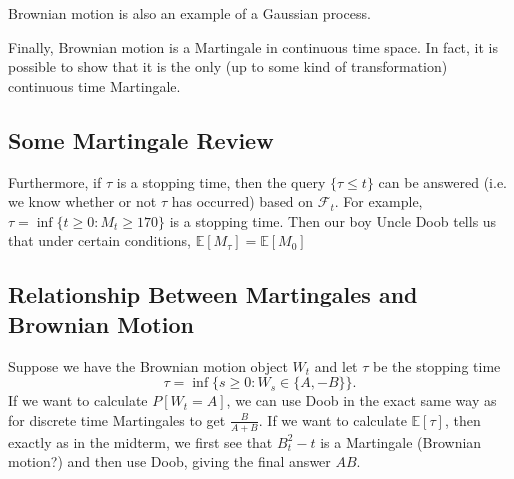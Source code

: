 Brownian motion is also an example of a Gaussian process.

Finally, Brownian motion is a Martingale in continuous time space. In fact, it is possible to show that it is the only (up to some kind of transformation) continuous time Martingale.

\subsection{Some Martingale Review}
 Furthermore, if $\tau$ is a stopping time, then the query $\{\tau\leq t\}$ can be answered (i.e. we know whether or not $\tau$ has occurred) based on $\mathcal F_t$. For example, $\tau=\inf\{t\geq 0:M_t\geq 170\}$ is a stopping time. Then our boy Uncle Doob tells us that under certain conditions, $\mathbb E[M_\tau] = \mathbb E[M_0]$

\subsection{Relationship Between Martingales and Brownian Motion}
Suppose we have the Brownian motion object $W_t$ and let $\tau$ be the stopping time $$ \tau=\inf\{s\geq 0:W_s\in\{A,-B\}\}. $$ If we want to calculate $P[W_t=A]$, we can use Doob in the exact same way as for discrete time Martingales to get $\frac{B}{A+B}$. If we want to calculate $\mathbb E[\tau]$, then exactly as in the midterm, we first see that $B_t^2-t$ is a Martingale (Brownian motion?) and then use Doob, giving the final answer $AB$.

